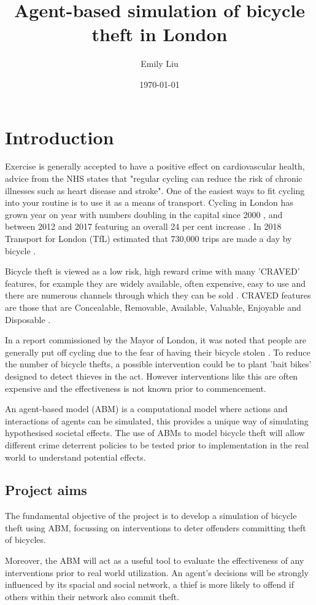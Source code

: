 \documentclass[11pt]{informatics-report}
\title{Agent-based simulation of bicycle theft in London}
\author{Emily Liu}
\date{\today}
\begin{document}
\createFrontMatter
\tableofcontents

\chapter{Introduction}
Exercise is generally accepted to have a positive effect on cardiovascular health, advice from the NHS states that "regular cycling can reduce the risk of chronic illnesses such as heart disease and stroke"\cite{nhs}. One of the easiest ways to fit cycling into your routine is to use it as a means of transport. Cycling in London has grown year on year with numbers doubling in the capital since 2000 \cite{latransport}, and between 2012 and 2017 featuring an overall 24 per cent increase  \cite{actionplan}. In 2018 Transport for London (TfL) estimated that 730,000 trips are made a day by bicycle \cite{tfl}. \par
Bicycle theft is viewed as a low risk, high reward crime with many 'CRAVED' features, for example they are widely available, often expensive, easy to use and there are numerous channels through which they can be sold \cite{ucl}. CRAVED features are those that are Concealable, Removable, Available, Valuable, Enjoyable and Disposable \cite{craved}. \par

In a report commissioned by the Mayor of London, it was noted that people are generally put off cycling due to the fear of having their bicycle stolen \cite{actionplan}. To reduce the number of bicycle thefts, a possible intervention could be to plant 'bait bikes' designed to detect thieves in the act. However interventions like this are often expensive and the effectiveness is not known prior to commencement. \par

An agent-based model (ABM) is a computational model where actions and interactions of agents can be simulated, this provides a unique way of simulating hypothesised societal effects. The use of ABMs to model bicycle theft will allow different crime deterrent policies to be tested prior to implementation in the real world to understand potential effects.

\section{Project aims}
The fundamental objective of the project is to develop a simulation of bicycle theft using ABM, focussing on interventions to deter offenders committing theft of bicycles. \par
Moreover, the ABM will act as a useful tool to evaluate the effectiveness of any interventions prior to real world utilization. An agent's decisions will be strongly influenced by its spacial and social network, a thief is more likely to offend if others within their network also commit theft. 
\end{document}
